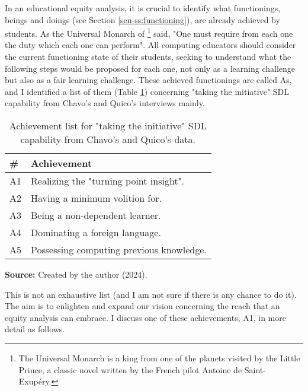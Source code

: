 In an educational equity analysis, it is crucial to identify what functionings, beings and doings (see Section \ref{sen-ss:functioning}), are already achieved by students. As the Universal Monarch of \footnote{The Universal Monarch is a king from one of the planets visited by the Little Prince, a classic novel written by the French pilot Antoine de Saint-Exupéry.} said, "One must require from each one the duty which each one can perform". All computing educators should consider the current functioning state of their students, seeking to understand what the following steps would be proposed for each one, not only as a learning challenge but also as a fair learning challenge. These achieved functionings are called \glspl{A}, and I identified a list of them (Table \ref{tbl:achievement-list}) concerning "taking the initiative" \gls{SDL} capability from Chavo's and Quico's interviews mainly. 

\begin{table}[ht]
\caption{Achievement list for "taking the initiative" \acrshort{SDL} capability from Chavo's and Quico's data.}
\label{tbl:achievement-list}
\centering
{}
\begin{tabular}{p{0.5cm}p{8.5cm}}
\hline
\textbf{\#} &
\textbf{Achievement}\\
\hline     
A1 &
Realizing the "turning point insight".\\
A2 & 
Having a minimum volition for. \\
A3 &
Being a non-dependent learner. \\
A4 &
Dominating a foreign language. \\
A5 &
Possessing computing previous knowledge.\\
\hline

\end{tabular}
\par\medskip\ABNTEXfontereduzida\selectfont\textbf{Source:} Created by the author (2024). \par\medskip
\end{table}

This is not an exhaustive list (and I am not sure if there is any chance to do it). The aim is to enlighten and expand our vision concerning the reach that an equity analysis can embrace. I discuss one of these achievements, \gls{A}1, in more detail as follows.

